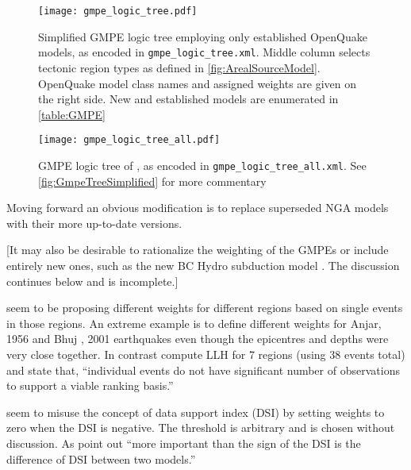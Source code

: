 \documentclass{article}
\begin{document}
\begin{figure}[!htb]
\begin{adjustbox}{center}
\texttt{[image: gmpe\_logic\_tree.pdf]}
\end{adjustbox}
\caption[Simplified GMPE logic tree]{Simplified GMPE logic tree employing only established OpenQuake models, as encoded in \texttt{gmpe\_logic\_tree.xml}. Middle column selects tectonic region types as defined in \autoref{fig:ArealSourceModel}. OpenQuake model class names and assigned weights are given on the right side. New and established models are enumerated in \autoref{table:GMPE}}
\label{fig:GmpeTreeSimplified}
\end{figure}

\begin{figure}
\begin{adjustbox}{center}
\texttt{[image: gmpe\_logic\_tree\_all.pdf]}
\end{adjustbox}
\caption[Original GMPE logic tree]{GMPE logic tree of \cite{nath2012probabilistic}, as encoded in \texttt{gmpe\_logic\_tree\_all.xml}. See \autoref{fig:GmpeTreeSimplified} for more commentary}
\label{fig:GmpeTreeNath}
\end{figure}

Moving forward an obvious modification is to replace superseded NGA models with their more up-to-date versions. 

[It may also be desirable to rationalize the weighting of the GMPEs or include entirely new ones, such as the new BC Hydro subduction model \citep{abrahamson2012bc}. The discussion continues below and is incomplete.]

\cite{anbazhagan2015selection} seem to be proposing different weights for different regions based on single events in those regions. An extreme example is to define different weights for Anjar, 1956 and Bhuj , 2001 earthquakes even though the epicentres and depths were very close together. In contrast \cite{nath2011peak} compute LLH for 7 regions (using 38 events total) and state that, ``individual events do not have significant number of observations to support a viable ranking basis.''

\cite{anbazhagan2015selection} seem to misuse the concept of data support index (DSI) \citep{delavaud2012toward} by setting weights to zero when the DSI is negative. The threshold is arbitrary and is chosen without discussion. As \cite{delavaud2012toward} point out ``more important
than the sign of the DSI is the difference of DSI between
two models.''
\end{document}
